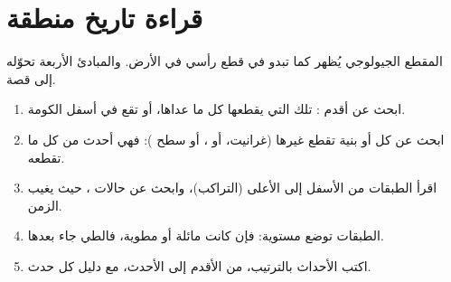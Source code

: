 \section{قراءة تاريخ منطقة}

المقطع الجيولوجي يُظهر  كما تبدو في قطع رأسي في الأرض. والمبادئ
الأربعة تحوّله إلى قصة.

\begin{method}\label{met:g7:geological-time:ordering}
\begin{enumerate}
  \item ابحث عن أقدم : تلك التي يقطعها كل ما عداها، أو تقع في أسفل
        الكومة.
  \item ابحث عن كل  أو بنية تقطع غيرها (غرانيت، أو ، أو سطح ):
        فهي أحدث من كل ما تقطعه.
  \item اقرأ الطبقات من الأسفل إلى الأعلى (التراكب)، وابحث عن حالات ، حيث يغيب الزمن.
  \item الطبقات توضع مستوية: فإن كانت مائلة أو مطوية، فالطي جاء بعدها.
  \item اكتب الأحداث بالترتيب، من الأقدم إلى الأحدث، مع دليل كل حدث.
\end{enumerate}
\end{method}

